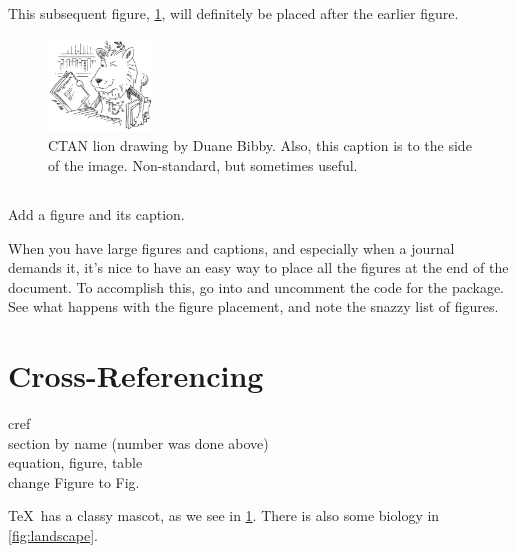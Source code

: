\documentclass{article}
\begin{document}
This subsequent figure, \cref{fig:lion}, will definitely be placed after the earlier figure.
\begin{figure}
\includegraphics[width=0.25\textwidth]{lion.png}
\caption{CTAN lion drawing by Duane Bibby.
    Also, this caption is to the side of the image.
    Non-standard, but sometimes useful.
}
\label{fig:lion}
\end{figure}

\subsection{\task}

Add a figure and its caption.

When you have large figures and captions, and especially when a journal demands it, it's nice to have an easy way to place all the figures at the end of the document.
To accomplish this, go into  and uncomment the code for the  package.
See what happens with the figure placement, and note the snazzy list of figures.

\section{Cross-Referencing}
\label{sec:refs}

cref \\
section by name (number was done above) \\
equation, figure, table \\
change Figure to Fig.

\TeX\ has a classy mascot, as we see in \cref{fig:lion}.
There is also some biology in \cref{fig:landscape}.
\end{document}
